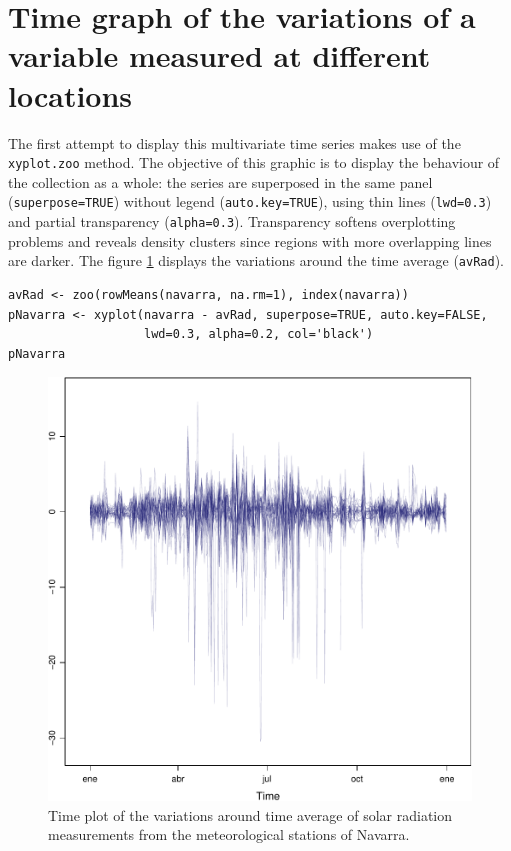 


\section{Time graph of the variations of a variable measured at different locations}
\label{sec-1}





    
    
  
  
    
  


The first attempt to display this multivariate time series makes
use of the \texttt{xyplot.zoo} method. The objective of this graphic is
to display the behaviour of the collection as a whole: the series
are superposed in the same panel (\texttt{superpose=TRUE}) without legend
(\texttt{auto.key=TRUE}), using thin lines (\texttt{lwd=0.3}) and partial
transparency (\texttt{alpha=0.3}). Transparency softens overplotting
problems and reveals density clusters since regions with more
overlapping lines are darker. The figure \ref{fig:navarraNaive}
displays the variations around the time average (\texttt{avRad}).


\lstset{language=R}
\begin{lstlisting}
avRad <- zoo(rowMeans(navarra, na.rm=1), index(navarra))
pNavarra <- xyplot(navarra - avRad, superpose=TRUE, auto.key=FALSE,
                   lwd=0.3, alpha=0.2, col='black') 
pNavarra
\end{lstlisting}

\begin{figure}[htb]
\centering
\includegraphics[width=.9\linewidth]{figs/navarra.pdf}
\caption{\label{fig:navarraNaive}Time plot of the variations around time average of solar radiation measurements from the meteorological stations of Navarra.}
\end{figure}


